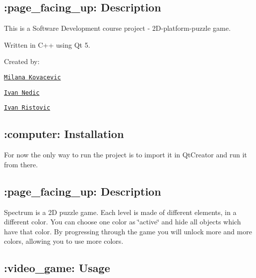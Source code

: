 

\subsection*{\+:page\+\_\+facing\+\_\+up\+: Description}

This is a Software Development course project -\/ 2\+D-\/platform-\/puzzle game.

Written in C++ using Qt 5.

Created by\+:
\begin{DoxyItemize}
\item \href{https://github.com/milana-kovacevic}{\tt Milana Kovacevic}
\item \href{https://github.com/asdf12346}{\tt Ivan Nedic}
\item \href{https://github.com/ivan-ristovic}{\tt Ivan Ristovic}
\end{DoxyItemize}

\subsection*{\+:computer\+: Installation}

For now the only way to run the project is to import it in Qt\+Creator and run it from there.

\subsection*{\+:page\+\_\+facing\+\_\+up\+: Description}

Spectrum is a 2D puzzle game. Each level is made of different elements, in a different color. You can choose one color as \char`\"{}active\char`\"{} and hide all objects which have that color. By progressing through the game you will unlock more and more colors, allowing you to use more colors.

\subsection*{\+:video\+\_\+game\+: Usage}

